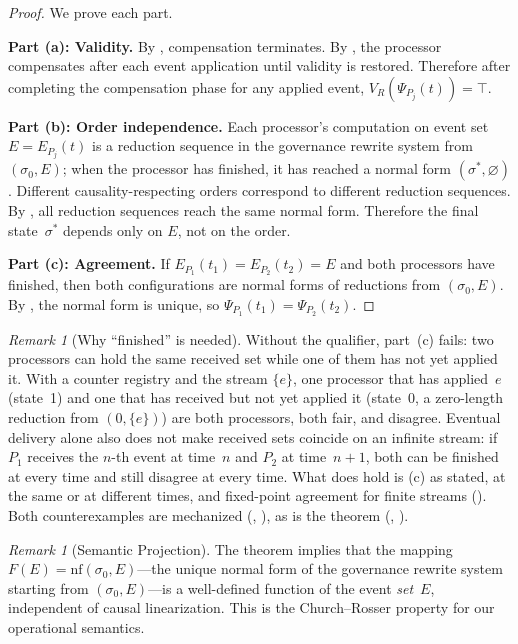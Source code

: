 \documentclass[11pt,a4paper]{article}
\theoremstyle{plain}
\theoremstyle{definition}
\theoremstyle{remark}
\newtheorem{remark}[theorem]{Remark}
\newcommand{\nf}{\mathrm{nf}}
\renewcommand{\_}{\textunderscore\allowbreak}
\begin{document}
\begin{proof}
We prove each part.

\medskip\noindent\textbf{Part (a): Validity.}\;
By , compensation terminates.  By
, the processor compensates after each event
application until validity is restored.  Therefore after completing the
compensation phase for any applied event,
$V_R(\Psi_{P_j}(t)) = \top$.

\medskip\noindent\textbf{Part (b): Order independence.}\;
Each processor's computation on event set $E = E_{P_j}(t)$ is a reduction
sequence in the governance rewrite system from $(\sigma_0, E)$; when the
processor has finished, it has reached a normal form $(\sigma^*, \varnothing)$.
Different causality-respecting orders correspond to different reduction
sequences.  By , all reduction sequences reach the same
normal form.  Therefore the final state~$\sigma^*$ depends only on $E$, not on
the order.

\medskip\noindent\textbf{Part (c): Agreement.}\;
If $E_{P_1}(t_1) = E_{P_2}(t_2) = E$ and both processors have finished, then
both configurations are normal forms of reductions from $(\sigma_0, E)$.  By
, the normal form is unique, so
$\Psi_{P_1}(t_1) = \Psi_{P_2}(t_2)$.
\end{proof}

\begin{remark}[Why ``finished'' is needed]
\label{rem:finished}
Without the qualifier, part~(c) fails: two processors can hold the same
received set while one of them has not yet applied it.  With a counter
registry and the stream $\{e\}$, one processor that has applied~$e$ (state~1)
and one that has received but not yet applied it (state~0, a zero-length
reduction from $(0, \{e\})$) are both processors, both fair, and disagree.
Eventual delivery alone also does not make received sets coincide on an
infinite stream: if $P_1$ receives the $n$-th event at time~$n$ and $P_2$ at
time~$n+1$, both can be finished at every time and still disagree at every
time.  What does hold is (c) as stated, at the same or at different times,
and fixed-point agreement for finite streams ().  Both
counterexamples are mechanized
(,
), as is the theorem
(, ).
\end{remark}

\begin{remark}[Semantic Projection]
\label{rem:set-function}
The theorem implies that the mapping $F(E) = \nf(\sigma_0, E)$---the unique
normal form of the governance rewrite system starting from $(\sigma_0, E)$---is
a well-defined function of the event \emph{set}~$E$, independent of causal
linearization.  This is the Church--Rosser property for our operational
semantics.
\end{remark}
\end{document}
